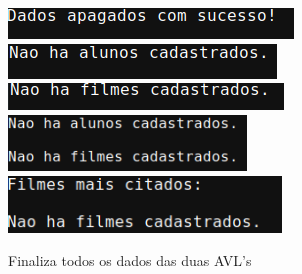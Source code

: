 \documentclass[12pt,a4paper,portuguese]{article}
\begin{document}
        \begin{figure}[H]
            \centering
            \includegraphics[height=.6cm]{imgs/finaliza_todos_os_dados.png}
            \includegraphics[height=.6cm]{imgs/lista_alunos_finalizado.png}
            \includegraphics[height=.6cm]{imgs/lista_filmes_finalizado.png}
            \includegraphics[height=1.5cm]{imgs/mostra_dados_arvores_finalizado.png}
            \includegraphics[height=1.5cm]{imgs/filmes_mais_citados_finalizado.png}
            \caption{Finaliza todos os dados das duas AVL's}
        \end{figure}
\end{document}
